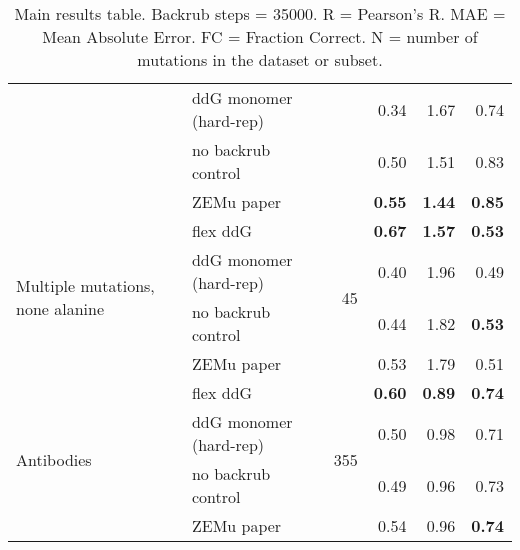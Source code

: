 \begin{table}
\begin{tabular}{llrrrr}
 & ddG monomer (hard-rep) & & 0.34 & 1.67 & 0.74  \\
 & no backrub control & & 0.50 & 1.51 & 0.83  \\
 & ZEMu paper & & \textbf{0.55} & \textbf{1.44} & \textbf{0.85}  \\
\hline
 \multirow{ 4}{*}{Multiple mutations, none alanine} & flex ddG & \multirow{ 4}{*}{45} & \textbf{0.67} & \textbf{1.57} & \textbf{0.53}  \\
 & ddG monomer (hard-rep) & & 0.40 & 1.96 & 0.49  \\
 & no backrub control & & 0.44 & 1.82 & \textbf{0.53}  \\
 & ZEMu paper & & 0.53 & 1.79 & 0.51  \\
\hline
 \multirow{ 4}{*}{Antibodies} & flex ddG & \multirow{ 4}{*}{355} & \textbf{0.60} & \textbf{0.89} & \textbf{0.74}  \\
 & ddG monomer (hard-rep) & & 0.50 & 0.98 & 0.71  \\
 & no backrub control & & 0.49 & 0.96 & 0.73  \\
 & ZEMu paper & & 0.54 & 0.96 & \textbf{0.74}  \\
\bottomrule
\end{tabular}
  \caption[]{
    Main results table. Backrub steps = 35000. R = Pearson's R. MAE = Mean Absolute Error. FC = Fraction Correct. N = number of mutations in the dataset or subset.
  } \label{tab:table-main}
\end{table}
